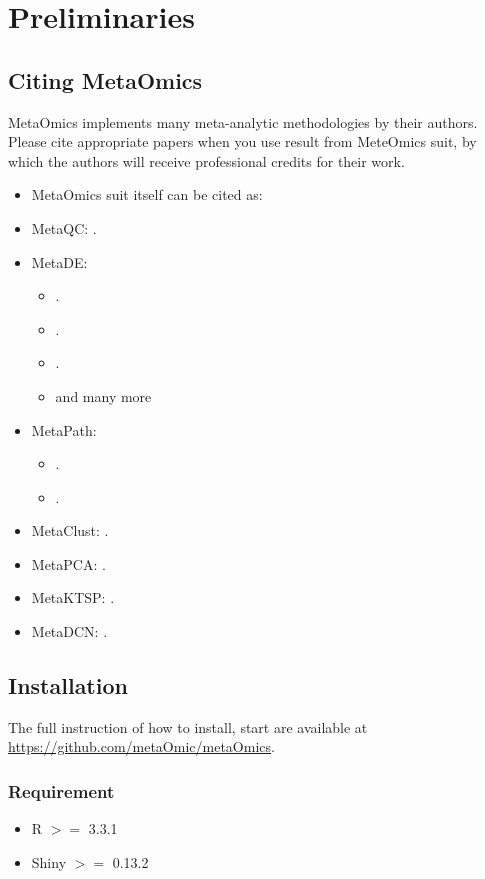 \section{Preliminaries}
\subsection{Citing MetaOmics}
MetaOmics implements many meta-analytic methodologies by their authors. 
Please cite appropriate papers when you use result from MeteOmics suit,
by which the authors will receive professional credits for their work.

\begin{itemize}
\item MetaOmics suit itself can be cited as:
\item MetaQC: .
\item MetaDE: 
\begin{itemize}
\item {}.
\item {}.
\item {}.
\item and many more
\end{itemize}
\item MetaPath: 
\begin{itemize}
\item {}.
\item {}.
\end{itemize}
\item MetaClust: .
\item MetaPCA: .
\item MetaKTSP: .
\item MetaDCN: .
\end{itemize}



\subsection{Installation}
The full instruction of how to install, start are available at \url{https://github.com/metaOmic/metaOmics}.
\subsubsection{Requirement}
\begin{itemize}
\item R $>=$ 3.3.1
\item Shiny $>=$ 0.13.2
\end{itemize}

